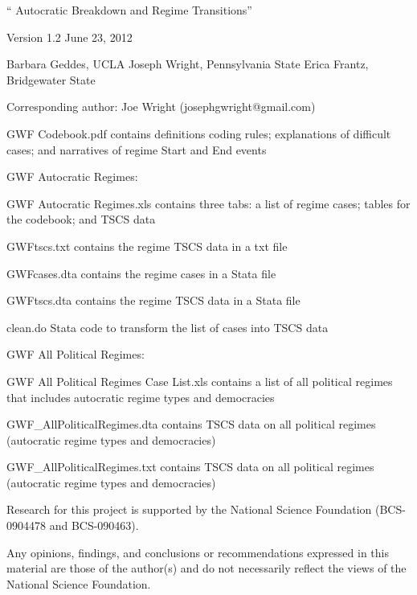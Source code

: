 `` Autocratic Breakdown and Regime Transitions''

Version 1.2 June 23, 2012

Barbara Geddes, UCLA 
Joseph Wright, Pennsylvania State
Erica Frantz, Bridgewater State

Corresponding author: Joe Wright (josephgwright@gmail.com)

GWF Codebook.pdf		contains definitions coding rules; explanations of difficult cases; and narratives of regime Start and End events



GWF Autocratic Regimes:

	GWF Autocratic Regimes.xls 	contains three tabs: a list of regime cases; tables for the codebook; and TSCS data

	GWFtscs.txt					contains the regime TSCS data in a txt file

	GWFcases.dta				contains the regime cases in a Stata file

	GWFtscs.dta					contains the regime TSCS data in a Stata file

	clean.do						Stata code to transform the list of cases into TSCS data

GWF All Political Regimes: 

	GWF All Political Regimes Case List.xls		contains a list of all political regimes that includes autocratic regime types and democracies
	
	GWF_AllPoliticalRegimes.dta				contains TSCS data on all political regimes (autocratic regime types and democracies)
	
	GWF_AllPoliticalRegimes.txt				contains TSCS data on all political regimes (autocratic regime types and democracies)


Research for this project is supported by the National Science Foundation (BCS-0904478 and BCS-090463).  

Any opinions, findings, and conclusions or recommendations expressed in this material are those of the author(s) 
and do not necessarily reflect the views of the National Science Foundation.


